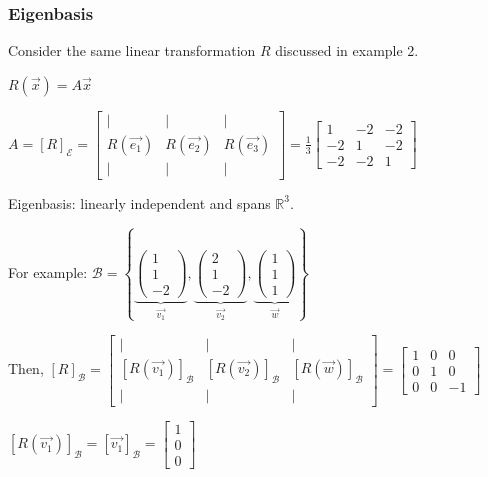 \documentclass[11pt,fleqn]{book} %
\begin{document}
\subsubsection{Eigenbasis}

Consider the same linear transformation $R$ discussed in example 2.

$R(\overrightarrow{x}) = A\overrightarrow{x}$

$A=[R]_\mathcal{E} = \begin{bmatrix} | &| &| \\ R(\overrightarrow{e_1}) &R(\overrightarrow{e_2}) &R(\overrightarrow{e_3}) \\ | &| &| \end{bmatrix} = \frac{1}{3}\begin{bmatrix} 1 &-2 &-2 \\ -2 &1 &-2 \\ -2 &-2 &1 \end{bmatrix}$

Eigenbasis: linearly independent and spans $\mathbb{R}^3$.

For example: $\mathcal{B} = \left\{
\underbrace{ \begin{pmatrix} 1\\1\\-2 \end{pmatrix} }_{\overrightarrow{v_1}},
\underbrace{ \begin{pmatrix} 2\\1\\-2 \end{pmatrix} }_{\overrightarrow{v_2}},
\underbrace{ \begin{pmatrix} 1\\1\\1 \end{pmatrix} }_{\overrightarrow{w}}
\right\}$

Then, $[R]_\mathcal{B} =
\begin{bmatrix} | &| &| \\ [R(\overrightarrow{v_1})]_\mathcal{B} &[R(\overrightarrow{v_2})]_\mathcal{B} &[R(\overrightarrow{w})]_\mathcal{B} \\ | &| &| \end{bmatrix} = \begin{bmatrix} 1 &0 &0 \\ 0 &1 &0 \\ 0 &0 &-1 \end{bmatrix}$

$[R(\overrightarrow{v_1})]_\mathcal{B} = [\overrightarrow{v_1}]_\mathcal{B} = \begin{bmatrix} 1\\0\\0 \end{bmatrix}$
\end{document}
